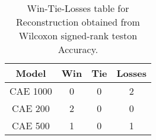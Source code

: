 \begin{table}[H]
\centering
\begin{tabular}{|c|c|c|c|}

\textbf{Model} &  \textbf{Win} &  \textbf{Tie} &  \textbf{Losses} \\
\hline

      CAE 1000 &             0 &             0 &                2 \\
\hline
       CAE 200 &             2 &             0 &                0 \\
\hline
       CAE 500 &             1 &             0 &                1 \\
\hline

\end{tabular}
\caption{Win-Tie-Losses table for Reconstruction obtained from Wilcoxon signed-rank teston Accuracy.}
\label{tab:reconstruction_model_comparison}
\end{table}